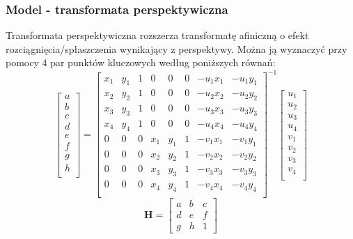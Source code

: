 \documentclass{article}
\begin{document}
	\subsubsection{Model - transformata perspektywiczna}
	Transformata perspektywiczna rozszerza transformatę afiniczną o efekt rozciągnięcia/spłaszczenia wynikający z perspektywy. Można ją wyznaczyć przy pomocy 4 par punktów kluczowych według  poniższych równań:
	 \begin{equation}
	\left[\begin{matrix}
	a \\
	b \\
	c \\
	d \\
	e \\
	f \\
	g \\
	h \\
	\end{matrix}\right]
	=
	\left[\begin{matrix}
	x_1 & y_1 & 1 & 0 & 0 & 0 & -u_1x_1 & -u_1y_1 \\
	x_2 & y_2 & 1 & 0 & 0 & 0 & -u_2x_2 & -u_2y_2 \\
	x_3 & y_3 & 1 & 0 & 0 & 0 & -u_3x_3 & -u_3y_3 \\
	x_4 & y_4 & 1 & 0 & 0 & 0 & -u_4x_4 & -u_4y_4 \\
	0 & 0 & 0 &  x_1 & y_1 & 1 & -v_1x_1 & -v_1y_1 \\
	0 & 0 & 0 &  x_2 & y_2 & 1 & -v_2x_2 & -v_2y_2 \\
	0 & 0 & 0 &  x_3 & y_3 & 1 & -v_3x_3 & -v_3y_3 \\
	0 & 0 & 0 &  x_4 & y_4 & 1 & -v_4x_4 & -v_4y_4 \\
	\end{matrix}\right]^{-1}
	\left[\begin{matrix}
	u_1 \\
	u_2 \\
	u_3 \\
	u_4 \\
	v_1 \\
	v_2 \\
	v_3 \\
	v_4 \\
	\end{matrix}\right]
	\end{equation}
	\begin{equation}
	\textbf{H} =\left[\begin{matrix}
	a & b & c \\
	d & e & f \\
	g & h & 1
	\end{matrix} \right]
	\end{equation}
\end{document}
